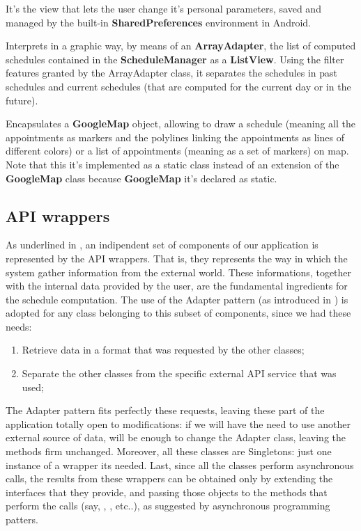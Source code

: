 It's the view that lets the user change it's personal parameters, saved and managed by the built-in \textbf{SharedPreferences} environment in Android.

Interprets in a graphic way, by means of an \textbf{ArrayAdapter}, the list of computed schedules contained in the \textbf{ScheduleManager} as a \textbf{ListView}. Using the filter features granted by the ArrayAdapter class, it separates the schedules in past schedules and current schedules (that are computed for the current day or in the future). 

Encapsulates a \textbf{GoogleMap} object, allowing to draw a schedule (meaning all the appointments as markers and the polylines linking the appointments as lines of different colors) or a list of appointments (meaning as a set of markers) on map. Note that this it's implemented as a static class instead of an extension of the \textbf{GoogleMap} class because \textbf{GoogleMap} it's declared as static.

\subsection{API wrappers} \label{sect:APIWrappers}
As underlined in , an indipendent set of components of our application is represented by the API wrappers. That is, they represents the way in which the system gather information from the external world. These informations, together with the internal data provided by the user, are the fundamental ingredients for the schedule computation.
The use of the Adapter pattern (as introduced in ) is adopted for any class belonging to this subset of components, since we had these needs:

\begin{enumerate}
\item Retrieve data in a format that was requested by the other classes;
\item Separate the other classes from the specific external API service that was used;
\end{enumerate}

The Adapter pattern fits perfectly these requests, leaving these part of the application totally open to modifications: if we will have the need to use another external source of data, will be enough to change the Adapter class, leaving the methods firm unchanged.
Moreover, all these classes are Singletons: just one instance of a wrapper its needed.
Last, since all the classes perform asynchronous calls, the results from these wrappers can be obtained only by extending the interfaces that they provide, and passing those objects to the methods that perform the calls (say, , , etc..), as suggested by asynchronous programming patters.

